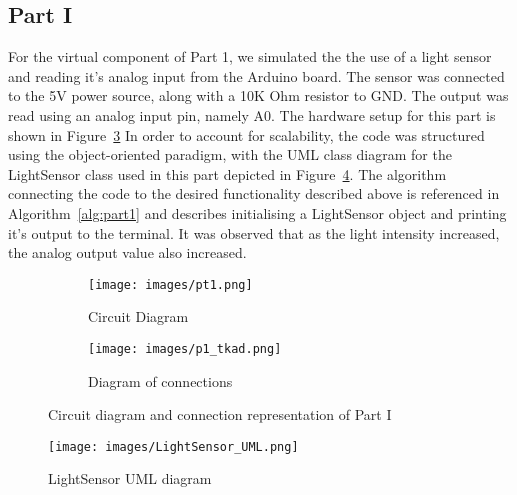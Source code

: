 \documentclass[journal]{IEEEtran}
\begin{document}
\subsection{Part I}
For the virtual component of Part 1, we simulated the the use of a light sensor and reading it's analog input from the Arduino board. The sensor was connected to the 5V power source, along with a 10K Ohm resistor to GND. The output was read using an analog input pin, namely A0. The hardware setup for this part is shown in Figure~\ref{fig:part1} In order to account for scalability, the code was structured using the object-oriented paradigm, with the UML class diagram for the LightSensor class used in this part depicted in Figure~\ref{fig:LightSensorUML}. 
The algorithm connecting the code to the desired functionality described above is referenced in Algorithm~\ref{alg:part1} and describes initialising a LightSensor object and printing it's output to the terminal. It was observed that as the light intensity increased, the analog output value also increased.
\begin{figure}[ht]
    \centering
      \begin{subfigure}[b]{0.2\textwidth}
         \centering
         \texttt{[image: images/pt1.png]} 
         \caption{Circuit Diagram}
         \label{fig:Circuit_diagram1}
     \end{subfigure}
     \begin{subfigure}[b]{0.2\textwidth}
         \centering
         \texttt{[image: images/p1\_tkad.png]} 
         \caption{Diagram of connections}
         \label{fig:connections1}
     \end{subfigure}  \hfill
    \caption{Circuit diagram and connection representation of Part I}
    \label{fig:part1}
\end{figure}
\begin{figure}[ht]
    \centering
    \texttt{[image: images/LightSensor\_UML.png]}
    \caption{LightSensor UML diagram}
    \label{fig:LightSensorUML}
\end{figure}
\end{document}
